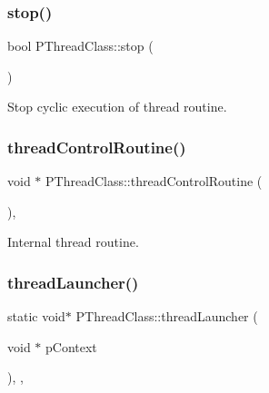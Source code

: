 \subsubsection{\texorpdfstring{stop()}{stop()}}
{\footnotesize\ttfamily bool P\+Thread\+Class\+::stop (\begin{DoxyParamCaption}{ }\end{DoxyParamCaption})\hspace{0.3cm}{\ttfamily [virtual]}}



Stop cyclic execution of thread routine. 

\mbox{\label{classPThreadClass_a012fe659b15bb0c0c19125ee0d1fa94e}} 
\subsubsection{\texorpdfstring{thread\+Control\+Routine()}{threadControlRoutine()}}
{\footnotesize\ttfamily void $\ast$ P\+Thread\+Class\+::thread\+Control\+Routine (\begin{DoxyParamCaption}{ }\end{DoxyParamCaption})\hspace{0.3cm}{\ttfamily [protected]}, {\ttfamily [virtual]}}



Internal thread routine. 

\mbox{\label{classPThreadClass_a0639ba7f95bfe914271a2fe4b61003b1}} 
\subsubsection{\texorpdfstring{thread\+Launcher()}{threadLauncher()}}
{\footnotesize\ttfamily static void$\ast$ P\+Thread\+Class\+::thread\+Launcher (\begin{DoxyParamCaption}\item[{void $\ast$}]{p\+Context }\end{DoxyParamCaption})\hspace{0.3cm}{\ttfamily [inline]}, {\ttfamily [static]}, {\ttfamily [protected]}}



